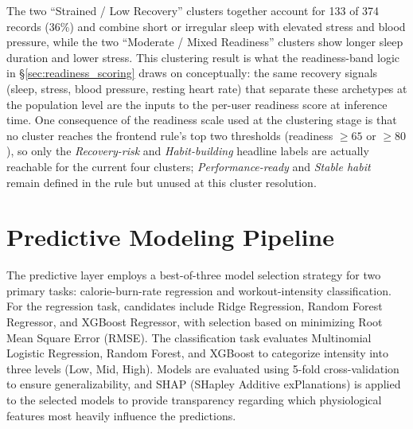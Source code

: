 \documentclass{aitthesis}
\begin{document}
The two ``Strained / Low Recovery'' clusters together account for 133 of 374 records (36\%) and combine short or irregular sleep with elevated stress and blood pressure, while the two ``Moderate / Mixed Readiness'' clusters show longer sleep duration and lower stress. This clustering result is what the readiness-band logic in \S\ref{sec:readiness_scoring} draws on conceptually: the same recovery signals (sleep, stress, blood pressure, resting heart rate) that separate these archetypes at the population level are the inputs to the per-user readiness score at inference time. One consequence of the readiness scale used at the clustering stage is that no cluster reaches the frontend rule's top two thresholds (readiness $\geq 65$ or $\geq 80$), so only the \emph{Recovery-risk} and \emph{Habit-building} headline labels are actually reachable for the current four clusters; \emph{Performance-ready} and \emph{Stable habit} remain defined in the rule but unused at this cluster resolution.

\section{Predictive Modeling Pipeline}
\label{sec:predictive_pipeline}

The predictive layer employs a best-of-three model selection strategy for two primary tasks: calorie-burn-rate regression and workout-intensity classification. For the regression task, candidates include Ridge Regression, Random Forest Regressor, and XGBoost Regressor, with selection based on minimizing Root Mean Square Error (RMSE). The classification task evaluates Multinomial Logistic Regression, Random Forest, and XGBoost to categorize intensity into three levels (Low, Mid, High). Models are evaluated using 5-fold cross-validation to ensure generalizability, and SHAP (SHapley Additive exPlanations) is applied to the selected models to provide transparency regarding which physiological features most heavily influence the predictions.
\end{document}
